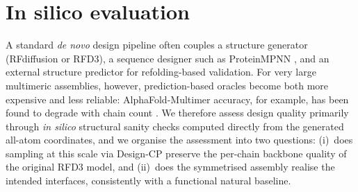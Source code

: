 

\section{In silico evaluation}
\label{sec:evaluation}

A standard \emph{de novo} design pipeline often couples a structure generator
(RFdiffusion or RFD3), a sequence designer such as ProteinMPNN
\parencite{dauparasRobustDeepLearning2022}, and an external structure predictor
for refolding-based validation. For very large multimeric assemblies, however,
prediction-based oracles become both more expensive and less reliable:
AlphaFold-Multimer accuracy, for example, has been found to degrade with chain
count \parencite{bryant_predicting_2022}. We therefore assess design quality
primarily through \emph{in silico} structural sanity checks computed directly from
the generated all-atom coordinates, and we organise the assessment into two
questions: (i)~does sampling at this scale via Design-CP preserve the per-chain
backbone quality of the original RFD3 model, and (ii)~does the symmetrised
assembly realise the intended interfaces, consistently with a functional natural
baseline.

